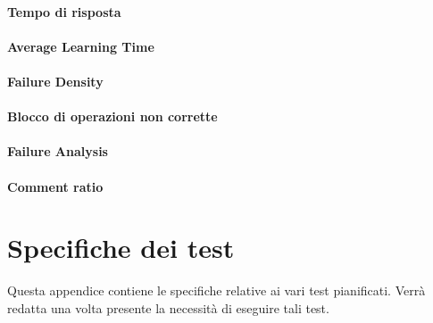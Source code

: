 \paragraph{Tempo di risposta} \Spazio
\paragraph{Average Learning Time} \Spazio
\paragraph{Failure Density} \Spazio
\paragraph{Blocco di operazioni non corrette} \Spazio
\paragraph{Failure Analysis} \Spazio
\paragraph{Comment ratio} \Spazio

\section{Specifiche dei test}
Questa appendice contiene le specifiche relative ai vari test pianificati. Verrà redatta una volta presente la necessità di eseguire tali test.
